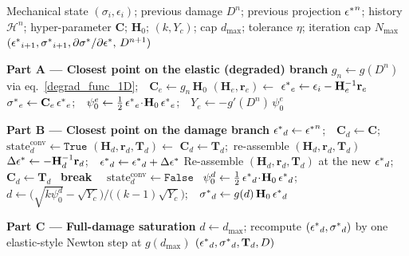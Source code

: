\documentclass[10pt]{cas-sc}
\begin{document}
\begin{algorithm}[h]
	\begin{algorithmic}[1]
		\Require Mechanical state $(\sigma_i,\epsilon_i)$; previous damage $D^n$; previous projection $\mbox{$\epsilon^*$}^n$;
		history $\mathcal{H}^n$; hyper-parameter $\mathbf{C}$; $\mathbf{H}_0$; $(k,Y_c)$;
		cap $d_{\max}$; tolerance $\eta$; iteration cap $N_{\max}$
		\Ensure   $(\mbox{$\epsilon^*$}_{i+1},\mbox{$\sigma^*$}_{i+1},\partial\mbox{$\sigma^*$}/\partial\mbox{$\epsilon^*$},\,D^{n+1})$
		
		\Statex \textbf{Part A --- Closest point on the elastic (degraded) branch}
		\State $g_n \gets g(D^n)$ via eq.~\eqref{degrad_func_1D};\ \ $\mathbf{C}_e \gets g_n\,\mathbf{H}_0$
		\State $(\mathbf{H}_e,\mathbf{r}_e)\gets$ 
		\State $\mbox{$\epsilon^*$}_e \gets \epsilon_i - \mathbf{H}_e^{-1}\mathbf{r}_e$
		\State $\mbox{$\sigma^*$}_e \gets \mathbf{C}_e\,\mbox{$\epsilon^*$}_e$;\ \ $\psi_0^e \gets \tfrac12\,\mbox{$\epsilon^*$}_e\!\cdot\!\mathbf{H}_0\,\mbox{$\epsilon^*$}_e$;\ \ $Y_e \gets -g'(D^n)\,\psi_0^e$
		
		\Statex \textbf{Part B --- Closest point on the damage branch}
		\State $\mbox{$\epsilon^*$}_d \gets \mbox{$\epsilon^*$}^n$;\ \ $\mathbf{C}_d \gets \mathbf{C}$;\ \ $\mathrm{state}_d^{\text{conv}}\gets\texttt{True}$
		\State $(\mathbf{H}_d,\mathbf{r}_d,\mathbf{T}_d) \gets$ 
		\State $\mathbf{C}_d \gets \mathbf{T}_d$;\ re-assemble $(\mathbf{H}_d,\mathbf{r}_d,\mathbf{T}_d)$
		\State $\Delta\mbox{$\epsilon^*$} \gets -\mathbf{H}_d^{-1}\mathbf{r}_d$;\ \ $\mbox{$\epsilon^*$}_d \gets \mbox{$\epsilon^*$}_d + \Delta\mbox{$\epsilon^*$}$
		\State Re-assemble $(\mathbf{H}_d,\mathbf{r}_d,\mathbf{T}_d)$ at the new $\mbox{$\epsilon^*$}_d$;\ \ $\mathbf{C}_d \gets \mathbf{T}_d$
		\If{$\|\Delta\epsst\| < \eta$}\ \textbf{break}\ \EndIf
		\EndFor
		\ $\mathrm{state}_d^{\text{conv}}\gets\texttt{False}$\ \EndIf
		\State $\psi_0^d \gets \tfrac12\,\mbox{$\epsilon^*$}_d\!\cdot\!\mathbf{H}_0\,\mbox{$\epsilon^*$}_d$;\ \ $d \gets \big(\sqrt{k\psi_0^d}-\sqrt{Y_c}\big)/\big((k-1)\sqrt{Y_c}\big)$;\ \ $\mbox{$\sigma^*$}_d \gets g(d)\,\mathbf{H}_0\,\mbox{$\epsilon^*$}_d$
		
		\Statex \textbf{Part C --- Full-damage saturation}
		\State $d \gets d_{\max}$; recompute $(\mbox{$\epsilon^*$}_d,\mbox{$\sigma^*$}_d)$ by one elastic-style Newton step at $g(d_{\max})$
		\State \Return $(\mbox{$\epsilon^*$}_d,\mbox{$\sigma^*$}_d,\mathbf{T}_d,D)$
		\EndIf
		

\end{algorithmic}
\end{algorithm}
\end{document}

